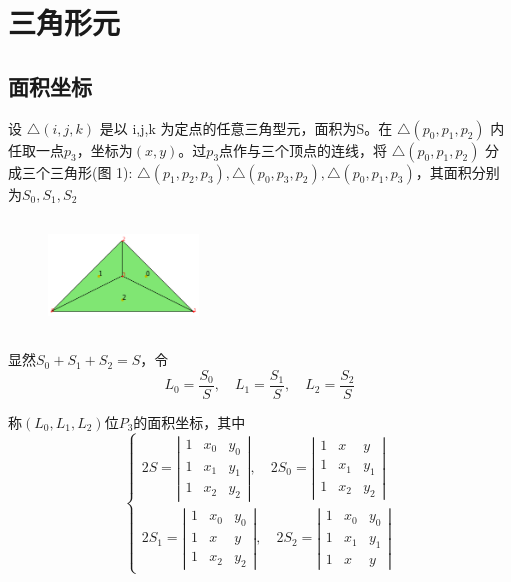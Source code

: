 \documentclass[UTF8,titlepage]{ctexart}
\begin{document}
\section{三角形元}

\subsection{面积坐标}

设 $ \bigtriangleup(i,j,k) $ 是以 i,j,k 为定点的任意三角型元，面积为S。在 $ \bigtriangleup (p_0,p_1,p_2) $ 内任取一点$p_3$，坐标为$(x,y)$。过$p_3$点作与三个顶点的连线，将 $ \bigtriangleup(p_0,p_1,p_2) $ 分成三个三角形(图 1): $ \bigtriangleup(p_1,p_2,p_3), \bigtriangleup(p_0,p_3,p_2), \bigtriangleup(p_0,p_1,p_3) $，其面积分别为$S_0,S_1,S_2$

\begin{figure}[hb]
	\centering
	\includegraphics[height=3cm,width=4cm]{../image/TriangleElement.png}
	\caption{}
	\label{SampleOfDatasets}
\end{figure}

显然$S_0 + S_1 + S_2 = S$，令
$$
	L_0 = \frac{S_0}{S}, \quad L_1 = \frac{S_1}{S}, \quad L_2 = \frac{S_2}{S}
$$
\par
称$(L_0,L_1,L_2)$位$P_3$的面积坐标，其中
$$
	\begin{cases}
		2S = \left| \begin{matrix}
				1 & x_0 & y_0 \\
				1 & x_1 & y_1 \\
				1 & x_2 & y_2
			 \end{matrix} \right| ,
		 \quad
		 2S_0 = \left| \begin{matrix}
		 			1 & x   & y   \\
		 			1 & x_1 & y_1 \\
		 			1 & x_2 & y_2
		 \end{matrix} \right| 
		 \\
		2S_1 = \left| \begin{matrix}
					1 & x_0 & y_0 \\
					1 & x   & y   \\
					1 & x_2 & y_2
			   \end{matrix} \right|,
		\quad
		2S_2 = \left| \begin{matrix}
					1 & x_0 & y_0 \\
					1 & x_1 & y_1 \\
					1 & x   & y
			   \end{matrix} \right|
	\end{cases}
$$
\end{document}
